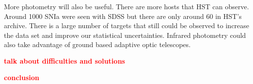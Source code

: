 \documentclass[apj, iop]{emulateapj}
\newcommand{\sn}{SNIa}
\newcommand{\todo}[1]{\textbf{\textcolor{red}{#1}}}
\begin{document}

More photometry will also be useful. There are more hosts that HST can observe.
Around 1000 \sn{} were seen with SDSS \citep{Campbell13} but there are only
around 60 in HST's archive. There is a large number of targets that still could be
observed to increase the data set and improve our statistical uncertainties.
Infrared photometry could also take advantage of ground based adaptive optic
telescopes.

\todo{talk about difficulties and solutions}

\todo{conclusion}






\end{document}
